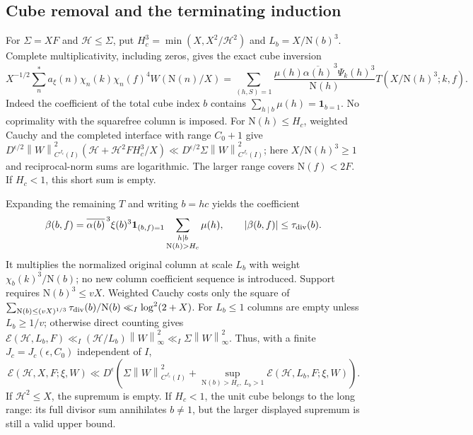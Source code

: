 \documentclass[11pt]{article}
\numberwithin{equation}{section}
\theoremstyle{definition}
\theoremstyle{remark}
\newcommand{\E}{\mathcal E}
\newcommand{\N}{\mathrm N}
\newcommand{\norm}[1]{\left\|#1\right\|}
\begin{document}
\subsection{Cube removal and the terminating induction}
For $\Sigma=XF$ and $\mathcal H\le\Sigma$, put
$H_c^3=\min(X,X^2/\mathcal H^2)$ and $L_b=X/\N(b)^3$.
Complete multiplicativity, including zeros, gives the exact cube inversion
\[
 X^{-1/2}\sum_n^*a_\xi(n)\chi_n(k)\chi_n(f)^4W(\N(n)/X)
 =\sum_{(h,S)=1}\frac{\mu(h)\overline{\alpha(h)}^{\,3}\Psi_k(h)^3}
 {\N(h)}T(X/\N(h)^3;k,f).
\]
Indeed the coefficient of the total cube index $b$ contains
$\sum_{h\mid b}\mu(h)=\mathbf1_{b=1}$. No coprimality with the
squarefree column is imposed. For $\N(h)\le H_c$, weighted Cauchy and the
completed interface with range $C_0+1$ give
$D^{\epsilon/2}\norm{W}_{C^{J_c}(I)}^2
(\mathcal H+\mathcal H^2FH_c^3/X)\ll
D^{\epsilon/2}\Sigma\norm{W}_{C^{J_c}(I)}^2$;
here $X/\N(h)^3\ge1$ and reciprocal-norm sums are logarithmic.
The larger range covers $\N(f)<2F$. If $H_c<1$, this short sum is empty.

Expanding the remaining $T$ and writing $b=hc$ yields the coefficient
\[
 \beta(b,f)=\overline{\alpha(b)}^{\,3}\xi(b)^3\mathbf1_{(b,f)=1}
       \sum_{\substack{h\mid b\\\N(h)>H_c}}\mu(h),
 \qquad |\beta(b,f)|\le\tau_{\rm div}(b).
\]
It multiplies the normalized original column at scale $L_b$ with weight
$\chi_b(k)^3/\N(b)$; no new column coefficient sequence is introduced.
Support requires $\N(b)^3\le vX$. Weighted Cauchy costs only the square
of $\sum_{\N(b)\le(vX)^{1/3}}\tau_{\rm div}(b)/\N(b)
\ll_I\log^2(2+X)$.
For $L_b\le1$ columns are empty unless $L_b\ge1/v$; otherwise direct
counting gives $\E(\mathcal H,L_b,F)\ll_I
(\mathcal H/L_b)\norm{W}_\infty^2\ll_I\Sigma\norm{W}_\infty^2$.
Thus, with a finite $J_c=J_c(\epsilon,C_0)$ independent of $I$,
\begin{equation}\label{eq:consolidated-cubes}
 \E(\mathcal H,X,F;\xi,W)\ll D^\epsilon
 \left(\Sigma\norm{W}_{C^{J_c}(I)}^2+
 \sup_{\N(b)>H_c,\ L_b>1}\E(\mathcal H,L_b,F;\xi,W)\right).
\end{equation}
If $\mathcal H^2\le X$, the supremum is empty. If $H_c<1$, the unit cube
belongs to the long range: its full divisor sum annihilates $b\ne1$,
but the larger displayed supremum is still a valid upper bound.
\end{document}

